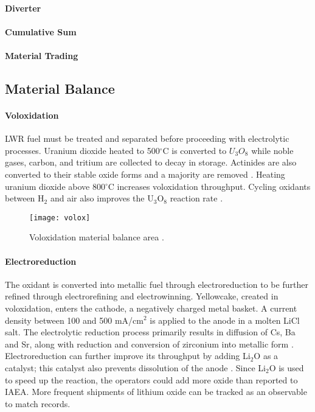 \paragraph{Diverter}

\paragraph{Cumulative Sum}

\paragraph{Material Trading}

\subsection{Material Balance}
\paragraph{Voloxidation}

\gls{LWR} fuel must be treated and separated before proceeding with electrolytic processes. Uranium dioxide heated to 
500$^{\circ}$C is converted to $U_3O_8$ while noble gases, carbon, and tritium are collected to decay in storage. 
Actinides are also converted to their stable oxide forms and a majority are removed \cite{flowsheet_1998,jubin_spent_2009}. 
Heating uranium dioxide above 800$^{\circ}$C increases voloxidation throughput.
Cycling oxidants between H$_2$ and air also improves the U$_3$O$_8$ reaction rate \cite{jubin_spent_2009}.

\begin{figure} 
	\centering
	\texttt{[image: volox]}
	\caption{Voloxidation material balance area \cite{jubin_spent_2009}.}
	\label{fig:volox}
\end{figure}

\paragraph{Electroreduction}

The oxidant is converted into metallic fuel through electroreduction to be further refined through electrorefining and electrowinning. 
Yellowcake, created in voloxidation, enters the cathode, a negatively charged metal basket. 
A current density between 100 and 500 mA/cm$^2$ is applied to the anode in a molten LiCl salt. 
The electrolytic reduction process primarily results in diffusion of Cs, Ba and Sr, along with reduction and conversion of zirconium into metallic form \cite{choi_electrochemical_2015,flowsheet_1998}.
Electroreduction can further improve its throughput by adding Li$_2$O as a catalyst; this catalyst also prevents dissolution 
of the anode \cite{choi_electrochemical_2015}. Since Li$_2$O is used to speed up the reaction,
the operators could add more oxide than reported to \gls{IAEA}. More frequent shipments 
of lithium oxide can be tracked as an observable to match records.

